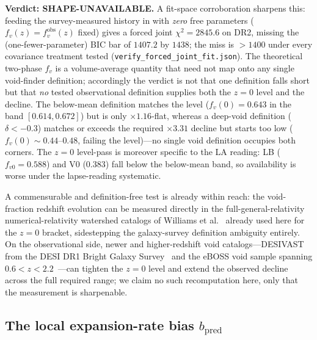 \documentclass[aps,prd,twocolumn,nofootinbib,superscriptaddress,floatfix]{revtex4-2}
\newcommand{\fvo}{f_{v0}}
\newcommand{\fv}{f_{v}}
\newcommand{\fvz}{f_{v}(z)}
\newcommand{\bpred}{b_{\mathrm{pred}}}
\begin{document}
\textbf{Verdict: SHAPE-UNAVAILABLE.} A fit-space corroboration
sharpens this: feeding the survey-measured history in with \emph{zero} free
parameters ($\fvz=f_v^{\mathrm{obs}}(z)$ fixed) gives a forced joint
$\chi^2=2845.6$ on DR2, missing the (one-fewer-parameter) BIC bar
\cite{KassRaftery1995} of $1407.2$ by $1438$; the miss is $>1400$ under every
covariance treatment tested (\texttt{verify\_forced\_joint\_fit.json}). The
theoretical two-phase $\fv$ is a
volume-average quantity that need not map onto any single void-finder definition;
accordingly the verdict is not that one definition falls short but that \emph{no}
tested observational definition supplies both the $z=0$ level and the decline. The
below-mean definition matches the level ($f_v(0)=0.643$ in the band
$[0.614,0.672]$) but is only $\times1.16$-flat, whereas a deep-void definition
($\delta<-0.3$) matches or exceeds the required $\times3.31$ decline but starts too
low ($f_v(0)\sim0.44$--$0.48$, failing the level)---no single void definition
occupies both corners. The $z=0$ level-pass is moreover specific to the LA reading:
LB ($\fvo=0.588$) and V0 ($0.383$) fall below the below-mean band, so availability
is worse under the lapse-reading systematic.

A commensurable and definition-free test is already within reach: the void-fraction
redshift evolution can be measured directly in the full-general-relativity
numerical-relativity watershed catalogs of Williams et al.~\cite{Williams2024}
already used here for the $z=0$ bracket, sidestepping the galaxy-survey definition
ambiguity entirely. On the observational side, newer and higher-redshift void
catalogs---DESIVAST from the DESI DR1 Bright Galaxy Survey~\cite{Rincon2024} and
the eBOSS void sample spanning $0.6<z<2.2$~\cite{Aubert2020}---can tighten the
$z=0$ level and extend the observed decline across the full required range; we
claim no such recomputation here, only that the measurement is sharpenable.

\subsection{The local expansion-rate bias $\bpred$}
\label{subsec:bpred}
\end{document}
